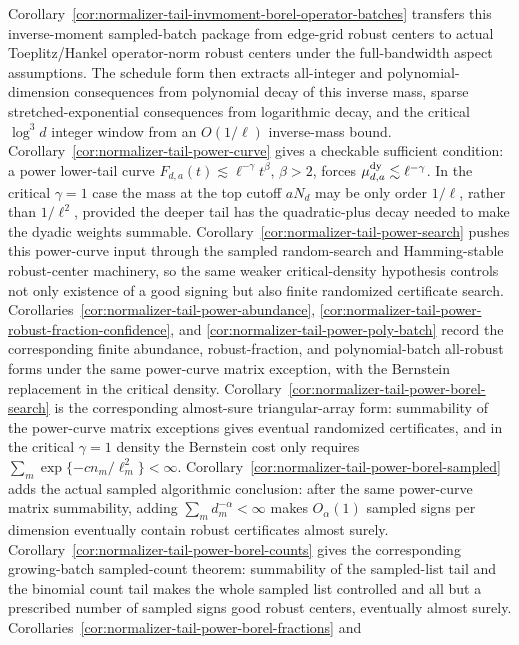\documentclass[11pt]{amsart}
\numberwithin{equation}{section}
\theoremstyle{definition}
\theoremstyle{remark}
\begin{document}
Corollary~\ref{cor:normalizer-tail-invmoment-borel-operator-batches} transfers
this inverse-moment sampled-batch package from edge-grid robust centers to
actual Toeplitz/Hankel operator-norm robust centers under the full-bandwidth
aspect assumptions.
The schedule form then extracts all-integer and polynomial-dimension
consequences from polynomial decay of this inverse mass, sparse
stretched-exponential consequences from logarithmic decay, and the critical
\(\log^3d\) integer window from an \(O(1/\ell)\) inverse-mass bound.
Corollary~\ref{cor:normalizer-tail-power-curve} gives a checkable sufficient
condition: a power lower-tail curve \(F_{d,a}(t)\lesssim \ell^{-\gamma}t^\beta\),
\(\beta>2\), forces \(\mu_{d,a}^{\rm dy}\lesssim \ell^{-\gamma}\).  In the
critical \(\gamma=1\) case the mass at the top cutoff \(aN_d\) may be only
order \(1/\ell\), rather than \(1/\ell^2\), provided the deeper tail has the
quadratic-plus decay needed to make the dyadic weights summable.
Corollary~\ref{cor:normalizer-tail-power-search} pushes this power-curve input
through the sampled random-search and Hamming-stable robust-center machinery, so
the same weaker critical-density hypothesis controls not only existence of a
good signing but also finite randomized certificate search.
Corollaries~\ref{cor:normalizer-tail-power-abundance},
\ref{cor:normalizer-tail-power-robust-fraction-confidence}, and
\ref{cor:normalizer-tail-power-poly-batch} record the corresponding finite
abundance, robust-fraction, and polynomial-batch all-robust forms under the
same power-curve matrix exception, with the Bernstein replacement in the
critical density.
Corollary~\ref{cor:normalizer-tail-power-borel-search} is the corresponding
almost-sure triangular-array form: summability of the power-curve matrix
exceptions gives eventual randomized certificates, and in the critical
\(\gamma=1\) density the Bernstein cost only requires
\(\sum_m\exp\{-c n_m/\ell_m^2\}<\infty\).
Corollary~\ref{cor:normalizer-tail-power-borel-sampled} adds the actual sampled
algorithmic conclusion: after the same power-curve matrix summability, adding
\(\sum_m d_m^{-\alpha}<\infty\) makes \(O_\alpha(1)\) sampled signs per
dimension eventually contain robust certificates almost surely.
Corollary~\ref{cor:normalizer-tail-power-borel-counts} gives the corresponding
growing-batch sampled-count theorem: summability of the sampled-list tail and
the binomial count tail makes the whole sampled list controlled and all but a
prescribed number of sampled signs good robust centers, eventually almost
surely.
Corollaries~\ref{cor:normalizer-tail-power-borel-fractions} and
\end{document}
